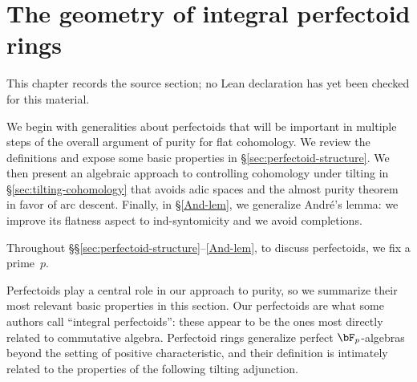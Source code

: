 \chapter{The geometry of integral perfectoid rings}
\label{purity-flat-cohomology-chapter-02}

\begin{remark}
\label{purity-flat-cohomology-chapter-02-source}
This chapter records the source section; no Lean declaration has yet been checked for this material.
\notready
\end{remark}


We begin with generalities about perfectoids that will be important in multiple steps of the overall argument of purity for flat cohomology. We review the definitions and expose some basic properties in \S\ref{sec:perfectoid-structure}. We then present an algebraic approach to controlling cohomology under tilting in \S\ref{sec:tilting-cohomology} that avoids adic spaces and the almost purity theorem in favor of arc descent. Finally, in \S\ref{And-lem}, we generalize Andr\'{e}'s lemma: we improve its flatness aspect to ind-syntomicity and we avoid completions.

 \label{fixed-prime}
Throughout \S\S\ref{sec:perfectoid-structure}--\ref{And-lem}, to discuss perfectoids, we fix a prime~$p$.
\epp







 \label{sec:perfectoid-structure}


Perfectoids play a central role in our approach to purity, so we summarize their most relevant basic properties in this section. Our perfectoids are what some authors call ``integral perfectoids'': these appear to be the ones most directly related to commutative algebra. Perfectoid rings generalize perfect $\bF_p$-algebras beyond the setting of positive characteristic, and their definition is intimately related to the properties of the following tilting adjunction.


